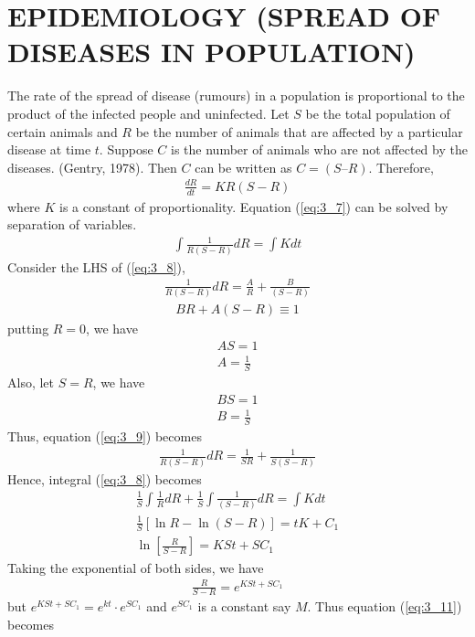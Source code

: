 \documentclass[11pt]{report}
\newcommand{\sps}{\\[0.2cm]}
\newcommand{\refn}[1]{(\ref{#1})}
\newcommand{\refx}[1]{\refn{eq:#1}}
\begin{document}
	\section{EPIDEMIOLOGY (SPREAD OF DISEASES IN POPULATION)}
	The rate of the spread of disease (rumours) in a population is proportional to the product of the infected people and uninfected. Let $S$ be the total population of certain animals and $R$ be the number of animals that are affected by a particular disease at time $t$. Suppose $C$ is the number of animals who are not affected by the diseases. (Gentry, 1978). Then $C$ can be written as $C = (S – R)$. Therefore,
	\begin{eqnarray}
		\frac{dR}{dt} = KR(S-R)\label{eq:3_7}
	\end{eqnarray}
	where $K$ is a constant of proportionality. Equation \refx{3_7} can be solved by separation of variables.
	\begin{eqnarray}
		\int\frac{1}{R(S-R)}dR = \int Kdt\label{eq:3_8}
	\end{eqnarray}
	Consider the LHS of \refx{3_8}, 
	\begin{eqnarray}
		\frac{1}{R(S-R)}dR = \frac{A}{R}+\frac{B}{(S-R)}\label{eq:3_9}
	\end{eqnarray}
	\begin{eqnarray*}
		BR + A(S-R) \equiv 1
	\end{eqnarray*}
	putting $R=0$, we have
	\begin{eqnarray*}
		AS = 1 \\
		A = \frac{1}{S}
	\end{eqnarray*}
	Also, let $S=R$, we have
	\begin{eqnarray*}
		BS = 1\\
		B = \frac{1}{S}
	\end{eqnarray*}
	Thus, equation \refx{3_9} becomes
	\begin{eqnarray}
		\frac{1}{R(S-R)}dR = \frac{1}{SR}+\frac{1}{S(S-R)}\label{eq:3_10}
	\end{eqnarray}
	Hence, integral \refx{3_8} becomes
	\begin{eqnarray*}
		\frac{1}{S}\int\frac{1}{R}dR + \frac{1}{S}\int\frac{1}{(S-R)}dR = \int Kdt\sps
		\frac{1}{S}\left[\ln R - \ln(S-R)\right] = tK + C_1\sps
		\ln\left[\frac{R}{S-R}\right] = KSt + SC_1
	\end{eqnarray*}
	Taking the exponential of both sides, we have
	\begin{eqnarray}
		\frac{R}{S-R} = e^{KSt + SC_1}\label{eq:3_11}
	\end{eqnarray}
	but $e^{KSt+SC_1} = e^{kt}\cdot e^{SC_1}$ and $e^{SC_1}$ is a constant say $M$. Thus equation \refx{3_11} becomes
\end{document}
